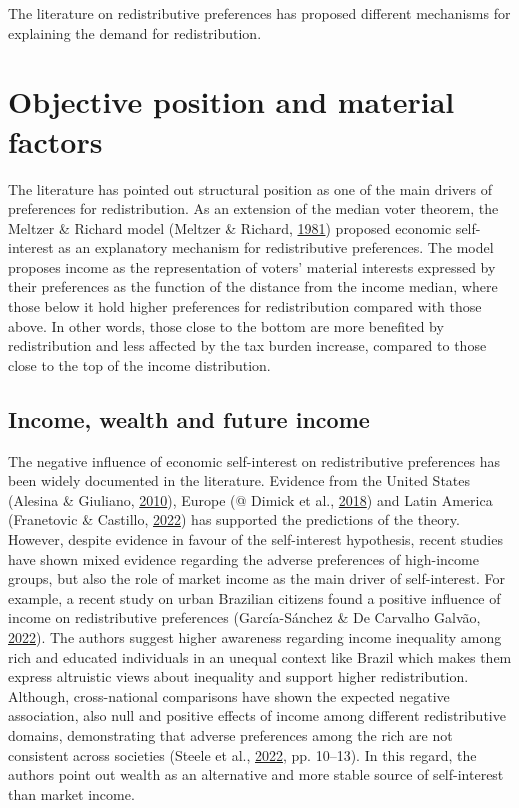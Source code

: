 \documentclass[
  12pt,
]{book}
\begin{document}
The literature on redistributive preferences has proposed different mechanisms for explaining the demand for redistribution.

\hypertarget{objective-position-and-material-factors}{%
\chapter{Objective position and material factors}\label{objective-position-and-material-factors}}

The literature has pointed out structural position as one of the main drivers of preferences for redistribution. As an extension of the median voter theorem, the Meltzer \& Richard model (Meltzer \& Richard, \protect\hyperlink{ref-Meltzer81}{1981}) proposed economic self-interest as an explanatory mechanism for redistributive preferences. The model proposes income as the representation of voters' material interests expressed by their preferences as the function of the distance from the income median, where those below it hold higher preferences for redistribution compared with those above. In other words, those close to the bottom are more benefited by redistribution and less affected by the tax burden increase, compared to those close to the top of the income distribution.

\hypertarget{income-wealth-and-future-income}{%
\section{Income, wealth and future income}\label{income-wealth-and-future-income}}

The negative influence of economic self-interest on redistributive preferences has been widely documented in the literature. Evidence from the United States (Alesina \& Giuliano, \protect\hyperlink{ref-alesina_preferences_2010}{2010}), Europe (@ Dimick et al., \protect\hyperlink{ref-dimick_models_2018}{2018}) and Latin America (Franetovic \& Castillo, \protect\hyperlink{ref-franetovic_preferences_2022}{2022}) has supported the predictions of the theory. However, despite evidence in favour of the self-interest hypothesis, recent studies have shown mixed evidence regarding the adverse preferences of high-income groups, but also the role of market income as the main driver of self-interest. For example, a recent study on urban Brazilian citizens found a positive influence of income on redistributive preferences (García-Sánchez \& De Carvalho Galvão, \protect\hyperlink{ref-garcia-sanchez_creencias_2022}{2022}). The authors suggest higher awareness regarding income inequality among rich and educated individuals in an unequal context like Brazil which makes them express altruistic views about inequality and support higher redistribution. Although, cross-national comparisons have shown the expected negative association, also null and positive effects of income among different redistributive domains, demonstrating that adverse preferences among the rich are not consistent across societies (Steele et al., \protect\hyperlink{ref-steele_wealth_2022}{2022}, pp. 10--13). In this regard, the authors point out wealth as an alternative and more stable source of self-interest than market income.
\end{document}
